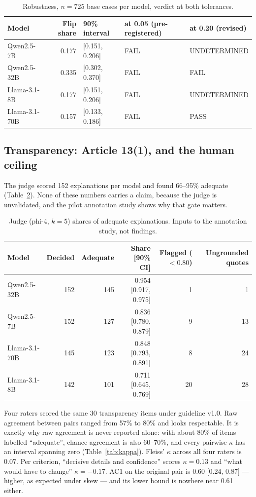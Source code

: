\documentclass[11pt,a4paper]{article}
\begin{document}
\begin{table}[h]
\centering\small
\begin{tabular}{@{}lrlll@{}}
\toprule
Model & Flip share & 90\% interval & at 0.05 (pre-registered) & at 0.20 (revised) \\
\midrule
Qwen2.5-7B    & 0.177 & [0.151, 0.206] & FAIL & UNDETERMINED \\
Qwen2.5-32B   & 0.335 & [0.302, 0.370] & FAIL & FAIL \\
Llama-3.1-8B  & 0.177 & [0.151, 0.206] & FAIL & UNDETERMINED \\
Llama-3.1-70B & 0.157 & [0.133, 0.186] & FAIL & PASS \\
\bottomrule
\end{tabular}
\caption{Robustness, $n = 725$ base cases per model, verdict at both tolerances.}
\label{tab:robust}
\end{table}

\subsection{Transparency: Article 13(1), and the human ceiling}

The judge scored 152 explanations per model and found 66--95\% adequate
(Table~\ref{tab:judge}). None of these numbers carries a claim, because the
judge is unvalidated, and the pilot annotation study shows why that gate
matters.

\begin{table}[h]
\centering\small
\begin{tabular}{@{}lrrrrr@{}}
\toprule
Model & Decided & Adequate & Share [90\% CI] & Flagged ($<0.80$) & Ungrounded quotes \\
\midrule
Qwen2.5-32B   & 152 & 145 & 0.954 [0.917, 0.975] & 1  & 1 \\
Qwen2.5-7B    & 152 & 127 & 0.836 [0.780, 0.879] & 9  & 13 \\
Llama-3.1-70B & 145 & 123 & 0.848 [0.793, 0.891] & 8  & 24 \\
Llama-3.1-8B  & 142 & 101 & 0.711 [0.645, 0.769] & 20 & 28 \\
\bottomrule
\end{tabular}
\caption{Judge (phi-4, $k=5$) shares of adequate explanations. Inputs to the annotation study, not findings.}
\label{tab:judge}
\end{table}

Four raters scored the same 30 transparency items under guideline v1.0.
Raw agreement between pairs ranged from 57\% to 80\% and looks respectable.
It is exactly why raw agreement is never reported alone: with about 80\% of
items labelled ``adequate'', chance agreement is also 60--70\%, and every
pairwise $\kappa$ has an interval spanning zero (Table~\ref{tab:kappa}).
Fleiss' $\kappa$ across all four raters is 0.07. Per criterion, ``decisive
details and confidence'' scores $\kappa = 0.13$ and ``what would have to
change'' $\kappa = -0.17$. AC1 on the original pair is 0.60 [0.24, 0.87] ---
higher, as expected under skew --- and its lower bound is nowhere near 0.61
either.
\end{document}
